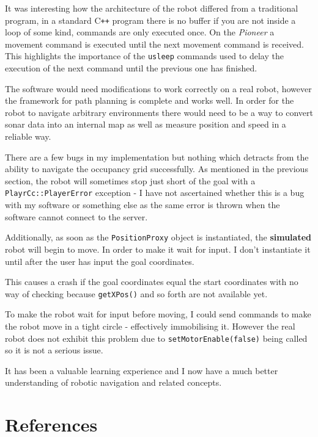 \documentclass[a4paper,12pt]{article}
\begin{document}
It was interesting how the architecture of the robot differed from a traditional program, in a standard C\texttt{++} program there is no buffer if you are not inside a loop of some kind, commands are only executed once. On the \textit{Pioneer} a movement command is executed until the next movement command is received. This highlights the importance of the \texttt{usleep} commands used to delay the execution of the next command until the previous one has finished.

The software would need modifications to work correctly on a real robot, however the framework for path planning is complete and works well. In order for the robot to navigate arbitrary environments there would need to be a way to convert sonar data into an internal map as well as measure position and speed in a reliable way. 

There are a few bugs in my implementation but nothing which detracts from the ability to navigate the occupancy grid successfully. As mentioned in the previous section, the robot will sometimes stop just short of the goal with a \texttt{PlayrCc::PlayerError} exception - I have not ascertained whether this is a bug with my software or something else as the same error is thrown when the software cannot connect to the server.

Additionally, as soon as the \texttt{PositionProxy} object is instantiated, the \textbf{simulated} robot will begin to move. In order to make it wait for input. I don't instantiate it until after the user has input the goal coordinates. 

This causes a crash if the goal coordinates equal the start coordinates with no way of checking because \texttt{getXPos()} and so forth are not available yet. 

To make the robot wait for input before moving, I could send commands to make the robot move in a tight circle - effectively immobilising it. However the real robot does not exhibit this problem due to \texttt{setMotorEnable(false)} being called so it is not a serious issue.

It has been a valuable learning experience and I now have a much better understanding of robotic navigation and related concepts.
\section{References}
\end{document}
